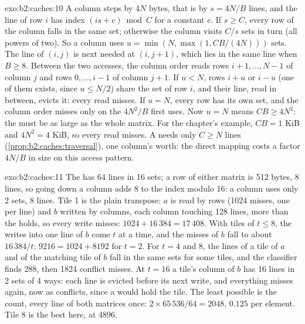 \begin{solution}{exo:b2:caches:10}
A column steps by $4N$ bytes, that is by $s = 4N / B$ lines, and the line of row $i$ has index $(i s + c) \bmod C$
for a constant $c$. If $s \ge C$, every row of the column falls in the same set; otherwise the column visits $C / s$
sets in turn (all powers of two). So a column uses $u = \min(N, \max(1, C B / (4N)))$ sets.
The line of $(i, j)$ is next needed at $(i, j + 1)$, which lies in the same line when $B \ge 8$. Between the two
accesses, the column order reads rows $i + 1, \dots, N - 1$ of column $j$ and rows $0, \dots, i - 1$ of column
$j + 1$. If $u < N$, rows $i + u$ or $i - u$ (one of them exists, since $u \le N / 2$) share the set of row $i$, and
their line, read in between, evicts it: every read misses. If $u = N$, every row has its own set, and the column order
misses only on the $4N^2 / B$ first uses. Now $u = N$ means $C B \ge 4N^2$: the  must be as large as the whole
matrix. For the chapter's example, $C B = 1$ KiB and $4N^2 = 4$ KiB, so every read misses. A 
needs only $C \ge N$ lines (\cref{prop:b2:caches:traversal}), one column's worth: the direct mapping costs a factor
$4N / B$ in size on this access pattern.
\end{solution}

\begin{solution}{exo:b2:caches:11}
The  has 64 lines in 16 sets; a row of either matrix is 512 bytes, 8 lines, so going down a column adds 8 to
the index modulo 16: a column uses only 2 sets, 8 lines.
Tile 1 is the plain transpose: $a$ is read by rows (1024 misses, one per line) and $b$ written by columns, each
column touching 128 lines, more than the  holds, so every write misses: $1024 + 16\,384 = 17\,408$. With tiles of
$t \le 8$, the writes into one line of $b$ come $t$ at a time, and the misses of $b$ fall to about $16\,384 / t$:
$9216 = 1024 + 8192$ for $t = 2$. For $t = 4$ and 8, the lines of a tile of $a$ and of the matching tile of $b$ fall in
the same sets for some tiles, and the classifier finds 288, then 1824 conflict misses. At $t = 16$ a tile's column of $b$
has 16 lines in 2 sets of 4 ways: each line is evicted before its next write, and everything misses again, now as
conflicts, since a  would hold the tile. The least possible is the  count, every
line of both matrices once: $2 \times 65\,536 / 64 = 2048$, $0.125$ per element. Tile 8 is the best here, at 4896.
\end{solution}

